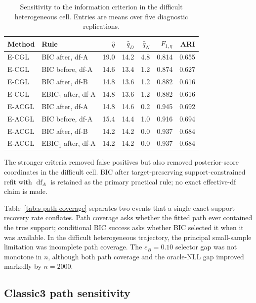 \documentclass[preprint,12pt,authoryear]{elsarticle}
\begin{document}
\begin{table}[H]
\centering
\footnotesize
\setlength{\tabcolsep}{3pt}
\caption{Sensitivity to the information criterion in the difficult
heterogeneous cell. Entries are means over five diagnostic replications.}
\label{tab:s-selector-sensitivity}
\begin{tabular}{llrrrrr}
\toprule
Method & Rule & $\widehat q$ & $\widehat q_D$ & $\widehat q_N$ & $F_{1,\eta}$ & ARI \\
\midrule
E-CGL & BIC after, df-A & 19.0 & 14.2 & 4.8 & 0.814 & 0.655 \\
E-CGL & BIC before, df-A & 14.6 & 13.4 & 1.2 & 0.874 & 0.627 \\
E-CGL & BIC after, df-B & 14.8 & 13.6 & 1.2 & 0.882 & 0.616 \\
E-CGL & EBIC$_1$ after, df-A & 14.8 & 13.6 & 1.2 & 0.882 & 0.616 \\
E-ACGL & BIC after, df-A & 14.8 & 14.6 & 0.2 & 0.945 & 0.692 \\
E-ACGL & BIC before, df-A & 15.4 & 14.4 & 1.0 & 0.916 & 0.694 \\
E-ACGL & BIC after, df-B & 14.2 & 14.2 & 0.0 & 0.937 & 0.684 \\
E-ACGL & EBIC$_1$ after, df-A & 14.2 & 14.2 & 0.0 & 0.937 & 0.684 \\
\bottomrule
\end{tabular}
\end{table}

The stronger criteria removed false positives but also removed posterior-score
coordinates in the difficult cell. BIC after target-preserving
support-constrained refit with $\operatorname{df}_A$ is retained
as the primary practical rule; no exact effective-df claim is made.

Table~\ref{tab:s-path-coverage} separates two events that a single exact-support
recovery rate conflates. Path coverage asks whether the fitted path ever
contained the true support; conditional BIC success asks whether BIC selected
it when it was available. In the difficult heterogeneous trajectory, the
principal small-sample limitation was incomplete path coverage. The
$e_B=0.10$ selector gap was not monotone in $n$, although both path coverage
and the oracle-NLL gap improved markedly by $n=2000$.



\subsection{Classic3 path sensitivity}
\end{document}
